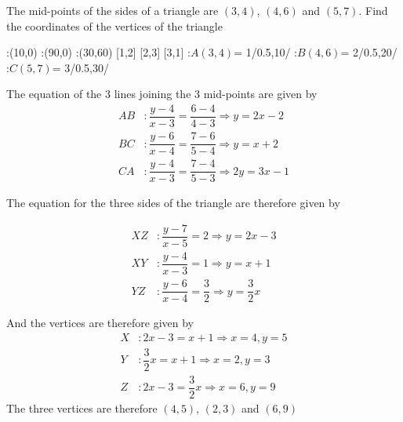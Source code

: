 

\question[5]   The mid-points of the sides of a triangle are $(3,4)$, $(4,6)$ and $(5,7)$. Find the coordinates of the vertices of the triangle

\ifprintanswers
	\begin{marginfigure}
		:(10,0)
		:(90,0)
		:(30,60)
		:$A(3,4)$= 1/0.5,10/
		:$B(4,6)$= 2/0.5,20/
		:$C(5,7)$= 3/0.5,30/
		\figdrawbegin{}
			\figdrawline[1,2,3,1]
			\figdrawline[11,21,31,11]
		\figdrawend
		\centerline{\box\figBoxA}
	\end{marginfigure}

\fi 

\begin{solution}[\fullpage]
	The equation of the 3 lines joining the 3 mid-points are given by
	\begin{align}
		AB &: \dfrac{y-4}{x-3} = \dfrac{6-4}{4-3} \Rightarrow y = 2x - 2 \\
		BC &: \dfrac{y-6}{x-4} = \dfrac{7-6}{5-4} \Rightarrow y = x + 2 \\
		CA &: \dfrac{y-4}{x-3} = \dfrac{7-4}{5-3} \Rightarrow 2y = 3x - 1
	\end{align}
	
	The equation for the three sides of the triangle are therefore given by
	
	\begin{align}
		XZ &: \dfrac{y-7}{x-5} = 2 \Rightarrow y = 2x - 3 \\
		XY &: \dfrac{y-4}{x-3} = 1 \Rightarrow y = x + 1 \\
		YZ &: \dfrac{y-6}{x-4} = \dfrac{3}{2} \Rightarrow y = \dfrac{3}{2}x
	\end{align}
	
	And the vertices are therefore given by
	\begin{align}
		X &: 2x-3 = x + 1 \Rightarrow x = 4, y = 5 \\
		Y &: \dfrac{3}{2}x = x + 1 \Rightarrow x = 2, y = 3 \\
		Z &: 2x-3 = \dfrac{3}{2}x \Rightarrow x = 6, y = 9
	\end{align}
	The three vertices are therefore $(4,5)$, $(2,3)$ and $(6,9)$
	
	
	
	
	
\end{solution}
